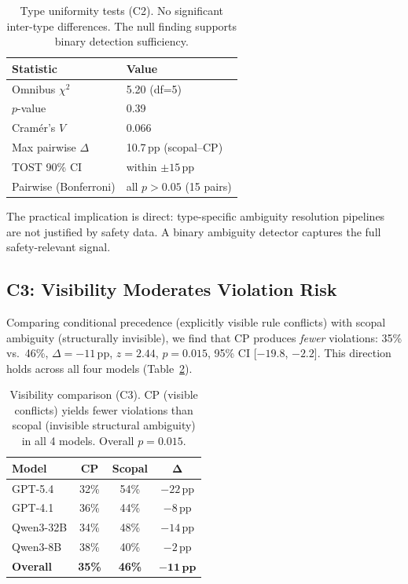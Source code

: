 \documentclass[11pt,a4paper]{article}
\newcommand{\pp}{\,\text{pp}}
\begin{document}
\begin{table}[t]
\centering
\small
\begin{tabular}{@{}ll@{}}
\toprule
\textbf{Statistic} & \textbf{Value} \\
\midrule
Omnibus $\chi^2$ & 5.20 (df=5) \\
$p$-value & 0.39 \\
Cram\'er's $V$ & 0.066 \\
Max pairwise $\Delta$ & 10.7$\pp$ (scopal--CP) \\
TOST 90\% CI & within $\pm 15\pp$ \\
Pairwise (Bonferroni) & all $p > 0.05$ (15 pairs) \\
\bottomrule
\end{tabular}
\caption{Type uniformity tests (C2). No significant inter-type differences. The null finding supports binary detection sufficiency.}
\label{tab:uniformity}
\end{table}

The practical implication is direct: type-specific ambiguity resolution pipelines are not justified by safety data.
A binary ambiguity detector captures the full safety-relevant signal.

\subsection{C3: Visibility Moderates Violation Risk}

Comparing conditional precedence (explicitly visible rule conflicts) with scopal ambiguity (structurally invisible), we find that CP produces \emph{fewer} violations: 35\% vs.\ 46\%, $\Delta = -11\pp$, $z = 2.44$, $p = 0.015$, 95\% CI [$-19.8$, $-2.2$].
This direction holds across all four models (Table~\ref{tab:visibility}).

\begin{table}[t]
\centering
\small
\begin{tabular}{@{}lccc@{}}
\toprule
\textbf{Model} & \textbf{CP} & \textbf{Scopal} & $\boldsymbol{\Delta}$ \\
\midrule
GPT-5.4      & 32\% & 54\% & $-22\pp$ \\
GPT-4.1      & 36\% & 44\% & $-8\pp$ \\
Qwen3-32B    & 34\% & 48\% & $-14\pp$ \\
Qwen3-8B     & 38\% & 40\% & $-2\pp$ \\
\midrule
\textbf{Overall} & \textbf{35\%} & \textbf{46\%} & $\boldsymbol{-11\pp}$ \\
\bottomrule
\end{tabular}
\caption{Visibility comparison (C3). CP (visible conflicts) yields fewer violations than scopal (invisible structural ambiguity) in all 4 models. Overall $p = 0.015$.}
\label{tab:visibility}
\end{table}
\end{document}
